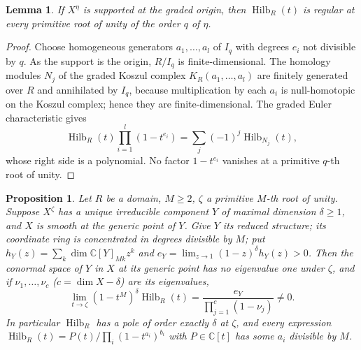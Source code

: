 \documentclass[11pt,a4paper]{article}
\newtheorem{proposition}[theorem]{Proposition}
\newtheorem{lemma}[theorem]{Lemma}
\theoremstyle{definition}
\newcommand{\C}{\mathbb{C}}
\newcommand{\Hilb}{\operatorname{Hilb}}
\begin{document}
\begin{lemma}\label{lem:isolated}
If $X^\eta$ is supported at the graded origin, then $\Hilb_R(t)$ is regular at
every primitive root of unity of the order $q$ of $\eta$.
\end{lemma}

\begin{proof}
Choose homogeneous generators $a_1,\dots,a_l$ of $I_q$ with degrees $e_i$ not
divisible by $q$. As the support is the origin, $R/I_q$ is finite-dimensional.
The homology modules $N_j$ of the graded Koszul complex $K_R(a_1,\dots,a_l)$
are finitely generated over $R$ and annihilated by $I_q$, because
multiplication by each $a_i$ is null-homotopic on the Koszul complex; hence
they are finite-dimensional. The graded Euler characteristic gives
\[
 \Hilb_R(t)\prod_{i=1}^l(1-t^{e_i})=\sum_j(-1)^j\Hilb_{N_j}(t),
\]
whose right side is a polynomial. No factor $1-t^{e_i}$ vanishes at a
primitive $q$-th root of unity.
\end{proof}

\begin{proposition}\label{prop:fixedcomponentpole}
Let $R$ be a domain, $M\ge2$, $\zeta$ a primitive $M$-th root of unity. Suppose
$X^\zeta$ has a unique irreducible component $Y$ of maximal dimension
$\delta\ge1$, and $X$ is smooth at the generic point of $Y$. Give $Y$ its
reduced structure; its coordinate ring is concentrated in degrees divisible
by $M$; put $h_Y(z)=\sum_k\dim\C[Y]_{Mk}z^k$ and
$e_Y=\lim_{z\to1}(1-z)^\delta h_Y(z)>0$. Then the conormal space of $Y$ in $X$
at its generic point has no eigenvalue one under $\zeta$, and if
$\nu_1,\dots,\nu_c$ ($c=\dim X-\delta$) are its eigenvalues,
\begin{equation}\label{eq:residue}
 \lim_{t\to\zeta}(1-t^M)^\delta\Hilb_R(t)=\frac{e_Y}{\prod_{j=1}^c(1-\nu_j)}\ne0 .
\end{equation}
In particular $\Hilb_R$ has a pole of order exactly $\delta$ at $\zeta$, and
every expression $\Hilb_R(t)=P(t)/\prod_i(1-t^{a_i})^{b_i}$ with $P\in\C[t]$
has some $a_i$ divisible by $M$.
\end{proposition}
\end{document}
